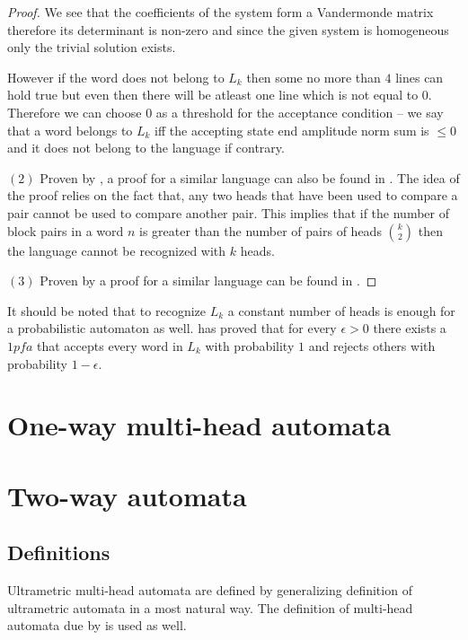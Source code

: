 \documentclass{llncs}
\begin{document}
\begin{proof}
We see that the coefficients of the system form a Vandermonde matrix therefore its determinant is non-zero and since the given system is homogeneous only the trivial solution exists.

However if the word does not belong to $L_k$ then some no more than $4$ lines can hold true but even then there will be atleast one line which is not equal to $0$. %
Therefore we can choose $0$ as a threshold for the acceptance condition -- we say that a word belongs to $L_k$ iff the accepting state end amplitude norm sum is $\leq 0$ and it does not belong to the language if contrary.

$(2)$ Proven by \citet{Freivalds1982,Freivalds1979}, a proof for a similar language can also be found in \citep{Yao1978}. The idea of the proof relies on the fact that, any two heads that have been used to compare a pair cannot be used to compare another pair. This implies that if the number of block pairs in a word $n$ is greater than the number of pairs of heads ${k\choose 2}$ then the language cannot be recognized with $k$ heads.

$(3)$ Proven by \citet{Freivalds1982} a proof for a similar language can be found in \citep{Yao1978}.
\end{proof}

It should be noted that to recognize $L_k$ a constant number of heads is enough for a probabilistic automaton as well. \citet{Freivalds1982} has proved that for every $\epsilon > 0$ there exists a $1pfa$ that accepts every word in $L_k$ with probability $1$ and rejects others with probability $1 - \epsilon$.

\section{One-way multi-head automata}

\section{Two-way automata}
\subsection{Definitions}
Ultrametric multi-head automata are defined by generalizing \citep{KasparsBalodis2013} definition of ultrametric automata in a most natural way. The definition of multi-head automata due by \citet{Holzer2009} is used as well.
\end{document}
